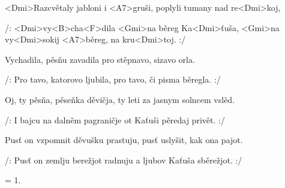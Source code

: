 


\zs



<Dmi>Razcvětaly jabloni i <A7>gruši, poplyli tumany nad 
re<Dmi>koj,

/: <Dmi>vy<B>cha<F>dila <Gmi>na běreg Ka<Dmi>ťuša, 
<Gmi>na vy<Dmi>sokij <A7>běreg, na kru<Dmi>toj. :/
\ks

\zs


Vychadila, pěsňu zavadila pro stěpnavo, sizavo orla.

/: Pro tavo, katorovo ljubila, pro tavo, či pisma běregla. :/
\ks

\zs


Oj, ty pěsňa, pěseňka děvičja, ty leti za jasnym solncem vslěd.

/: I bajcu na dalněm pagraničje ot Kaťuši pěredaj privět. :/
\ks

\zs


Pusť on vzpomnit děvušku prastuju, pusť uslyšit, kak ona pajot.

/: Pusť on zemlju berežjot radnuju a ljubov Kaťuša sběrežjot. :/
\ks

\zs
= 1.
\ks

\kp



